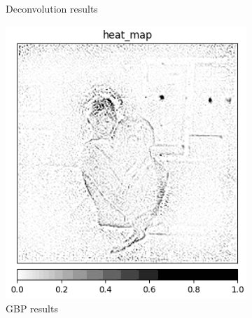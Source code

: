 \begin{figure}[h]
\begin{subfigure}{.25\textwidth}
    \caption{Deconvolution results}\label{fig:gbp-deconv-attributione}
\end{subfigure}
 \begin{subfigure}{.25\textwidth}
    \centering
    \includegraphics[width=\textwidth]{methods/images/1-4-0-rotation-30-Weimaraner-Weimaraner-gbp.png}
    \caption{GBP results}\label{fig:gbp-gbp-attribution}
\end{subfigure}
 \begin{subfigure}{.25\textwidth}
    \centering

\end{subfigure}
\end{figure}
